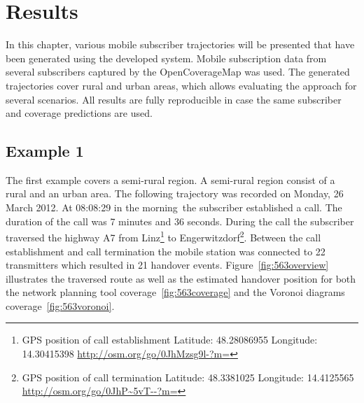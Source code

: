 \chapter{Results}
In this chapter, various mobile subscriber trajectories will be presented that have been generated using the developed system. Mobile subscription data from several subscribers captured by the OpenCoverageMap was used. The generated trajectories cover rural and urban areas, which allows evaluating the approach for several scenarios. All results are fully reproducible in case the same subscriber and coverage predictions are used.
\section{Example 1}
The first example covers a semi-rural region. A semi-rural region consist of a rural and an urban area. The following trajectory was recorded on Monday, 26 March 2012. At 08:08:29 in the morning\  the subscriber established a call. The duration of the call was 7 minutes and 36 seconds.  During the call the subscriber traversed the highway A7 from Linz\footnote{GPS position of call establishment Latitude: 48.28086955 Longitude:	14.30415398 \url{http://osm.org/go/0JhMzsg9l-?m=}} to Engerwitzdorf\footnote{GPS position of call termination Latitude: 48.3381025 Longitude:	14.4125565 \url{http://osm.org/go/0JhP~5vT--?m=}}. Between the call establishment and call termination the mobile station was connected to 22 transmitters which resulted in 21 handover events. Figure~\ref{fig:563overview} illustrates the traversed route as well as the estimated handover position for both the network planning tool coverage~\ref{fig:563coverage} and the Voronoi diagrams coverage~\ref{fig:563voronoi}.




